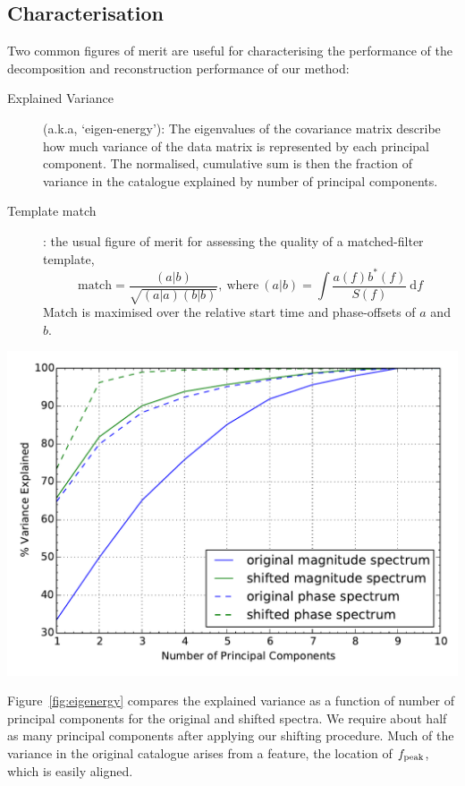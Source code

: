 \documentclass[a0,landscape]{a0poster}
\newcommand{\diff}{{\mathrm d}}
\begin{document}
\begin{multicols}{4}
\section*{\centering Characterisation}
Two common figures of merit are useful for characterising the performance of the
decomposition and reconstruction performance of our method:
\begin{description}
    \item [Explained Variance] (a.k.a, `eigen-energy'): The eigenvalues of the
        covariance matrix describe how much variance of the data matrix is
        represented by each principal component.  The normalised, cumulative sum
        is then the fraction of variance in the catalogue explained by number of
        principal components.
    \item [Template match]: the usual figure of merit for assessing the quality
        of a matched-filter template,
        \begin{equation}
            \text{match} = \frac{(a|b)}{\sqrt{(a|a) (b|b)}},~\text{where}~
            (a|b) = \int \frac{a(f)b^*(f)}{S(f)}~\diff f
        \end{equation}
        Match is maximised over the relative start time and phase-offsets of $a$
        and $b$.
\end{description}

%
%
\begin{center}%
    \includegraphics[width=0.5\linewidth]{eigenergy.pdf}
    \label{fig:eigenergy}
\end{center}%

Figure~\ref{fig:eigenergy} compares the explained variance as a function of
number of principal components for the original and shifted spectra.  We require
about half as many principal components after applying our shifting procedure.
Much of the variance in the original catalogue arises from a feature, the
location of $f_{\rm peak}$, which is easily aligned.



\end{multicols}
\end{document}
